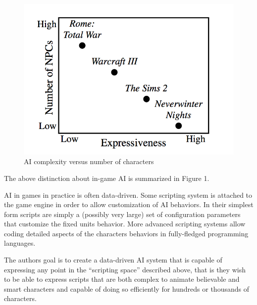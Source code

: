 \begin{figure}
\begin{center}
\includegraphics[scale=0.3]{characters_ai.png}
\end{center}
\label{fig:characters_ai}
\caption{AI complexity versus number of characters}
\end{figure}

The above distinction about in-game AI is summarized in Figure 1.

AI in games in practice is often data-driven. Some scripting system is attached to the game engine in order to allow customization of AI behaviors. In their simplest form scripts are simply a (possibly very large) set of configuration parameters that customize the fixed units behavior. More advanced scripting systems \cite{18,24} allow coding detailed aspects of the characters behaviors in fully-fledged programming languages.

The authors goal is to create a data-driven AI system that is capable of expressing any point in the ``scripting space'' described above, that is they wish to be able to express scripts that are both complex to animate believable and smart characters and capable of doing so efficiently for hundreds or thousands of characters.
